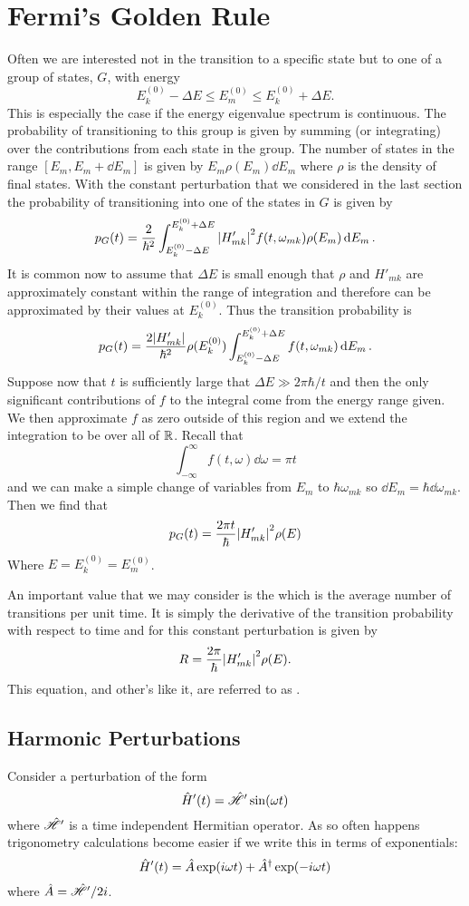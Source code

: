 \documentclass[a4paper]{article}
\begin{document}
    \section{Fermi's Golden Rule}
    Often we are interested not in the transition to a specific state but to one of a group of states, \(G\), with energy
    \[E_k^{(0)} - \Delta E \le E_m^{(0)} \le E_k^{(0)} + \Delta E.\]
    This is especially the case if the energy eigenvalue spectrum is continuous.
    The probability of transitioning to this group is given by summing (or integrating) over the contributions from each state in the group.
    The number of states in the range \([E_m, E_m + \dd{E_m}]\) is given by \(E_m\rho(E_m)\dd{E_m}\) where \(\rho\) is the density of final states.
    With the constant perturbation that we considered in the last section the probability of transitioning into one of the states in \(G\) is given by
    \[p_G(t) = \frac{2}{\hbar^2} \int_{E_k^{(0)} - \Delta E}^{E_k^{(0)} + \Delta E} \abs{H'_{mk}}^2 f(t, \omega_{mk}) \rho(E_m)\dd{E_m}.\]
    It is common now to assume that \(\Delta E\) is small enough that \(\rho\) and \(H'_{mk}\) are approximately constant within the range of integration and therefore can be approximated by their values at \(E_{k}^{(0)}\).
    Thus the transition probability is
    \[p_G(t) = \frac{2\abs{H'_{mk}}}{\hbar^2}\rho(E_k^{(0)}) \int_{E_k^{(0)} - \Delta E}^{E_k^{(0)} + \Delta E} f(t, \omega_{mk})\dd{E_m}.\]
    Suppose now that \(t\) is sufficiently large that \(\Delta E \gg 2\pi \hbar/t\) and then the only significant contributions of \(f\) to the integral come from the energy range given.
    We then approximate \(f\) as zero outside of this region and we extend the integration to be over all of \(\mathbb{R}\).
    Recall that
    \[\int_{-\infty}^{\infty} f(t, \omega) \dd{\omega} = \pi t\]
    and we can make a simple change of variables from \(E_m\) to \(\hbar\omega_{mk}\) so \(\dd{E_m} = \hbar\dd{\omega_{mk}}\).
    Then we find that
    \[p_G(t) = \frac{2\pi t}{\hbar} \abs{H'_{mk}}^2\rho(E)\]
    Where \(E = E_k^{(0)} = E_m^{(0)}\).
    
    An important value that we may consider is the  which is the average number of transitions per unit time.
    It is simply the derivative of the transition probability with respect to time and for this constant perturbation is given by
    \[R = \frac{2\pi}{\hbar} \abs{H'_{mk}}^2\rho(E).\]
    This equation, and other's like it, are referred to as .
    
    \subsection{Harmonic Perturbations}
    Consider a perturbation of the form
    \[\hat{H}'(t) = \hat{\mathscr{H}}'\sin(\omega t)\]
    where \(\hat{\mathscr{H}}'\) is a time independent Hermitian operator.
    As so often happens trigonometry calculations become easier if we write this in terms of exponentials:
    \[\hat{H}'(t) = \hat{A}\exp(i\omega t) + \hat{A}^\dagger\exp(-i\omega t)\]
    where \(\hat{A} = \hat{\mathscr{H}}'/2i\).
    
\end{document}
